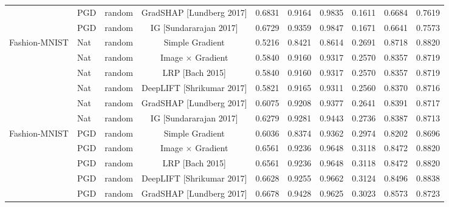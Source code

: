 \documentclass[letterpaper]{article} %
\begin{document}
\begin{table}[!ht]
\begin{center}
{\begin{tabular}{|l|l|c|c|c|c|c|c|c|c|}
      & PGD & random & GradSHAP [Lundberg 2017] & 0.6831 & 0.9164 & 0.9835 & 0.1611 & 0.6684 & 0.7619 \\ 
      & PGD & random & IG [Sundararajan 2017]  & 0.6729 & 0.9359 & 0.9847 & 0.1671 & 0.6641 & 0.7573 \\ 
\hline
Fashion-MNIST 
      & Nat & random & Simple Gradient    & 0.5216 & 0.8421 & 0.8614 & 0.2691 & 0.8718 & 0.8820 \\ 
      & Nat & random & Image $\times$ Gradient   & 0.5840 & 0.9160 & 0.9317 & 0.2570 & 0.8357 & 0.8719 \\ 
      & Nat & random & LRP [Bach 2015]  & 0.5840 & 0.9160 & 0.9317 & 0.2570 & 0.8357 & 0.8719 \\ 
      & Nat & random & DeepLIFT [Shrikumar 2017]    & 0.5821 & 0.9165 & 0.9311 & 0.2560 & 0.8370 & 0.8716 \\ 
      & Nat & random & GradSHAP [Lundberg 2017]   & 0.6075 & 0.9208 & 0.9377 & 0.2641 & 0.8391 & 0.8717 \\ 
      & Nat & random & IG [Sundararajan 2017]    & 0.6279 & 0.9281 & 0.9443 & 0.2736 & 0.8387 & 0.8713 \\ 
\hline
Fashion-MNIST 
      & PGD & random & Simple Gradient    & 0.6036 & 0.8374 & 0.9362 & 0.2974 & 0.8202 & 0.8696 \\ 
      & PGD & random & Image $\times$ Gradient   & 0.6561 & 0.9236 & 0.9648 & 0.3118 & 0.8472 & 0.8820 \\ 
      & PGD & random & LRP [Bach 2015]  & 0.6561 & 0.9236 & 0.9648 & 0.3118 & 0.8472 & 0.8820 \\
      & PGD & random & DeepLIFT [Shrikumar 2017]    & 0.6628 & 0.9255 & 0.9662 & 0.3124 & 0.8496 & 0.8838 \\ 
      & PGD & random & GradSHAP [Lundberg 2017]   & 0.6678 & 0.9428 & 0.9625 & 0.3023 & 0.8573 & 0.8723 \\ 

\end{tabular}}
\end{center}
\end{table}
\end{document}
